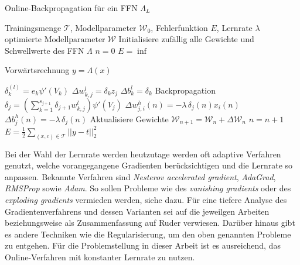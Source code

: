 \begin{algorithm}[h]
    \caption{Online-Backpropagation für ein FFN $\Lambda_L$}
    \label{alg:online_backprop}
    \begin{algorithmic}
    \Require  Trainingsmenge $\mathcal{T}$, Modellparameter $\mathcal{W}_0$, Fehlerfunktion $E$, Lernrate $\lambda$ 
    \Ensure $\text{optimierte Modellparameter} \; \mathcal{W}$
    \State Initialisiere zufällig alle Gewichte und Schwellwerte des FFN $\Lambda$ 
    \State $n=0$  
    \State $E=\inf$
     
        
        \State Vorwärtsrechnung $y=\Lambda(x)$

        \EndFor
        \State $\delta^{(l)}_k= e_k \psi'(V_k)$
        \State $\Delta w_{k,j}^l= \delta_k z_j$
        \State $\Delta b_{k}^l=  \delta_k$
        \State Backpropagation
            \State $\delta_j= \left(\sum_{k=1}^{s_{j+1}} \delta_{j+1} w_{k,j}^l\right) \psi'(V_j)$
            \State $\Delta w_{j,i}^h(n)= -\lambda \, \delta_j(n) x_i(n)$
            \State $\Delta b_{j}^h(n)= -\lambda \, \delta_j(n)$
        \EndFor
        \State Aktualisiere Gewichte 
        \State $\mathcal{W}_{n+1}= \mathcal{W}_n + \Delta \mathcal{W}_n$
        \State $n=n+1$
    \EndFor
    \State $E=\frac{1}{2} \sum_{(x,c) \in \mathcal{T}} ||y-t||_2^2$
    \EndWhile
    \end{algorithmic}
\end{algorithm}


Bei der Wahl der Lernrate werden heutzutage werden oft adaptive Verfahren genutzt, welche vorangegangene Gradienten berücksichtigen und die Lernrate so anpassen. Bekannte Verfahren sind \textit{Nesterov accelerated
gradient}\cite{sutskever2013importance}, \textit{AdaGrad}\cite{duchi2011adaptive}, \textit{RMSProp}\cite{tieleman2012lecture} sowie \textit{Adam}\cite{Kingma2015AdamAM}. So sollen Probleme wie des \textit{vanishing gradients} oder des \textit{exploding gradients} vermieden werden, siehe dazu\cite{hanin2018neural}.
Für eine tiefere Analyse des Gradientenverfahrens und dessen Varianten sei auf die jeweilgen Arbeiten beziehungsweise als Zusammenfassung auf Ruder\cite{ruder2016overview,} verwiesen. Darüber hinaus gibt es andere Techniken wie die Regularisierung, um den oben genannten Probleme zu entgehen.
Für die Problemstellung in dieser Arbeit ist es ausreichend, das Online-Verfahren mit konstanter Lernrate zu nutzen. 

